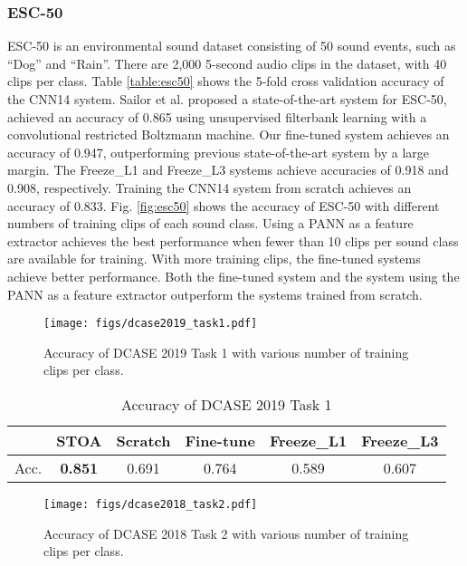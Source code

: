 \documentclass[journal]{IEEEtran}
\begin{document}
\subsubsection{ESC-50}
ESC-50 is an environmental sound dataset \cite{piczak2015esc} consisting of 50 sound events, such as ``Dog'' and ``Rain''. There are 2,000 5-second audio clips in the dataset, with 40 clips per class. Table \ref{table:esc50} shows the 5-fold cross validation \cite{piczak2015esc} accuracy of the CNN14 system. Sailor et al. \cite{sailor2017unsupervised} proposed a state-of-the-art system for ESC-50, achieved an accuracy of 0.865 using unsupervised filterbank learning with a convolutional restricted Boltzmann machine. Our fine-tuned system achieves an accuracy of 0.947, outperforming previous state-of-the-art system by a large margin. The Freeze\_L1 and Freeze\_L3 systems achieve accuracies of 0.918 and 0.908, respectively. Training the CNN14 system from scratch achieves an accuracy of 0.833. Fig. \ref{fig:esc50} shows the accuracy of ESC-50 with different numbers of training clips of each sound class. Using a PANN as a feature extractor achieves the best performance when fewer than 10 clips per sound class are available for training. With more training clips, the fine-tuned systems achieve better performance. Both the fine-tuned system and the system using the PANN as a feature extractor outperform the systems trained from scratch. 

\begin{figure}[t]
  \centering
  \centerline{\texttt{[image: figs/dcase2019\_task1.pdf]}}
  \caption{Accuracy of DCASE 2019 Task 1 with various number of training clips per class.}
  \label{fig:dcase2019_task1}
\end{figure}

\begin{table}[t]
\centering
\caption{Accuracy of DCASE 2019 Task 1}
\label{table:dcase2019_task1}
\begin{tabular}{*{6}{c}}
 \toprule
 & STOA \cite{chen2019integrating} & Scratch & Fine-tune & Freeze\_L1 & Freeze\_L3 \\
 \midrule
 Acc. & \textbf{0.851} & 0.691 & 0.764 & 0.589 & 0.607 \\
 \bottomrule
\end{tabular}
\end{table}

\begin{figure}[t!]
  \centering
  \centerline{\texttt{[image: figs/dcase2018\_task2.pdf]}}
  \caption{Accuracy of DCASE 2018 Task 2 with various number of training clips per class.}
  \label{fig:dcase2018_task2}
\end{figure}
\end{document}
